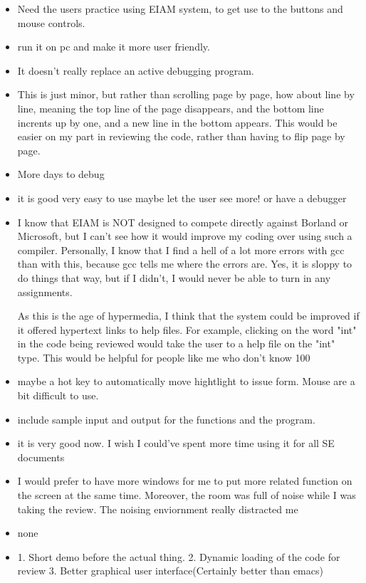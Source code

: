\begin{enumerate}
\begin{itemize}
\item Need the users practice using EIAM system, to get use to the buttons
and mouse controls.
\item run it on pc and make it more user friendly.
\item It doesn't really replace an active debugging program.
\item This is just minor, but rather than scrolling page by page, how about
line by line, meaning the top line of the page disappears, and the
bottom line incrents up by one, and a new line in the bottom
appears. This would be easier on my part in reviewing the code, rather
than having to flip page by page.
\item More days to debug
\item it is good
very easy to use
maybe let the user see more! or have a debugger 
\item I know that EIAM is NOT designed to compete directly against Borland
or Microsoft, but I can't see how it would improve my coding over
using such a compiler.  Personally, I know that I find a hell of a lot more
errors with gcc than with this, because gcc tells me where the errors are.
Yes, it is sloppy to do things that way, but if I didn't, I would
never be able to turn in any assignments.

As this is the age of hypermedia, I think that the system could be
improved if it offered hypertext links to help files.  For example,
clicking on the word "int" in the code being reviewed would take the
user to a help file on the "int" type.  This would be helpful for
people like me who don't know 100%

\item maybe a hot key to automatically move hightlight to issue form.  Mouse
are a bit difficult to use.
\item include sample input and output for the functions and the program.
\item it is very good now.  I wish I could've spent more time using it for
all SE documents
\item I would prefer to have more windows for me to put more related
function on the screen at the same time.  Moreover, the room was full
of noise while I was taking the review.  The noising enviornment really distracted me
\item none
\item 1. Short demo before the actual thing.
2. Dynamic loading of the code for review
3. Better graphical user interface(Certainly better than emacs)


\end{itemize}
\end{enumerate}
